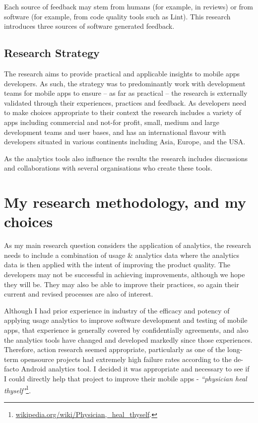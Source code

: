 Each source of feedback may stem from humans (for example, in reviews) or from software (for example, from code quality tools such as Lint). This research introduces three sources of software generated feedback.

\subsection{Research Strategy}
The research aims to provide practical and applicable insights to mobile apps developers. As such, the strategy was to predominantly work with development teams for mobile apps to ensure -- as far as practical -- the research is externally validated through their experiences, practices and feedback. As developers need to make choices appropriate to their context the research includes a variety of apps including commercial and not-for profit, small, medium and large development teams and user bases, and has an international flavour with developers situated in various continents including Asia, Europe, and the USA.

As the analytics tools also influence the results the research includes discussions and collaborations with several organisations who create these tools.


\section{My research methodology, and my choices}
As my main research question considers the application of analytics, the research needs to include a combination of usage \& analytics data where the analytics data is then applied with the intent of improving the product quality. The developers may not be successful in achieving improvements, although we hope they will be. They may also be able to improve their practices, so again their current and revised processes are also of interest.

Although I had prior experience in industry of the efficacy and potency of applying usage analytics to improve software development and testing of mobile apps, that experience is generally covered by confidentially agreements, and also the analytics tools have changed and developed markedly since those experiences. Therefore, action research seemed appropriate, particularly as one of the long-term opensource projects had extremely high failure rates according to the de-facto Android analytics tool. I decided it was appropriate and necessary to see if I could directly help that project to improve their mobile apps - \emph{``physician heal thyself"}\footnote{\href{https://en.wikipedia.org/wiki/Physician,\_heal\_thyself}{wikipedia.org/wiki/Physician,\_heal\_thyself}.}.

